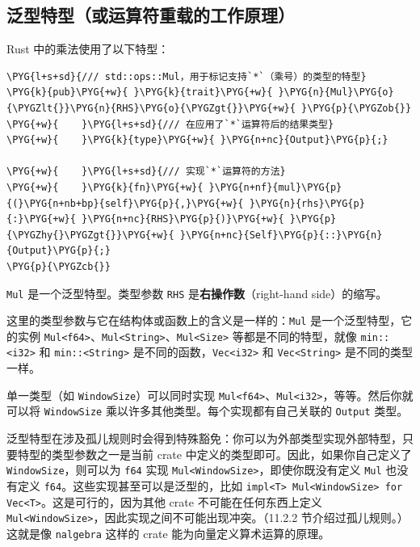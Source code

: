 \subsection{泛型特型（或运算符重载的工作原理）}

Rust 中的乘法使用了以下特型：

\begin{Verbatim}[commandchars=\\\{\},breaklines=true,breakanywhere=true,fontsize=\codefont,xleftmargin=17bp]
\PYG{l+s+sd}{/// std::ops::Mul，用于标记支持`*`（乘号）的类型的特型}
\PYG{k}{pub}\PYG{+w}{ }\PYG{k}{trait}\PYG{+w}{ }\PYG{n}{Mul}\PYG{o}{\PYGZlt{}}\PYG{n}{RHS}\PYG{o}{\PYGZgt{}}\PYG{+w}{ }\PYG{p}{\PYGZob{}}
\PYG{+w}{    }\PYG{l+s+sd}{/// 在应用了`*`运算符后的结果类型}
\PYG{+w}{    }\PYG{k}{type}\PYG{+w}{ }\PYG{n+nc}{Output}\PYG{p}{;}

\PYG{+w}{    }\PYG{l+s+sd}{/// 实现`*`运算符的方法}
\PYG{+w}{    }\PYG{k}{fn}\PYG{+w}{ }\PYG{n+nf}{mul}\PYG{p}{(}\PYG{n+nb+bp}{self}\PYG{p}{,}\PYG{+w}{ }\PYG{n}{rhs}\PYG{p}{:}\PYG{+w}{ }\PYG{n+nc}{RHS}\PYG{p}{)}\PYG{+w}{ }\PYG{p}{\PYGZhy{}\PYGZgt{}}\PYG{+w}{ }\PYG{n+nc}{Self}\PYG{p}{::}\PYG{n}{Output}\PYG{p}{;}
\PYG{p}{\PYGZcb{}}
\end{Verbatim}

\texttt{Mul} 是一个泛型特型。类型参数 \texttt{RHS} 是\textbf{右操作数}（right-hand side）的缩写。

这里的类型参数与它在结构体或函数上的含义是一样的：\texttt{Mul} 是一个泛型特型，它的实例 \texttt{Mul<f64>}、\texttt{Mul<String>}、\texttt{Mul<Size>} 等都是不同的特型，就像 \texttt{min::<i32>} 和 \texttt{min::<String>} 是不同的函数，\texttt{Vec<i32>} 和 \texttt{Vec<String>} 是不同的类型一样。

单一类型（如 \texttt{WindowSize}）可以同时实现 \texttt{Mul<f64>}、\texttt{Mul<i32>}，等等。然后你就可以将 \texttt{WindowSize} 乘以许多其他类型。每个实现都有自己关联的 \texttt{Output} 类型。

泛型特型在涉及孤儿规则时会得到特殊豁免：你可以为外部类型实现外部特型，只要特型的类型参数之一是当前 crate 中定义的类型即可。因此，如果你自己定义了 \texttt{WindowSize}，则可以为 \texttt{f64} 实现 \texttt{Mul<WindowSize>}，即使你既没有定义 \texttt{Mul} 也没有定义 \texttt{f64}。这些实现甚至可以是泛型的，比如 \texttt{impl<T> Mul<WindowSize> for Vec<T>}。这是可行的，因为其他 crate 不可能在任何东西上定义 \texttt{Mul<WindowSize>}，因此实现之间不可能出现冲突。（11.2.2 节介绍过孤儿规则。）这就是像 \texttt{nalgebra} 这样的 crate 能为向量定义算术运算的原理。

